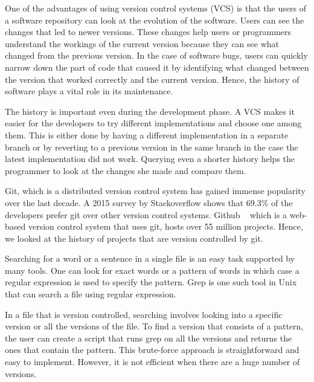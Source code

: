 


One of the advantages of using version control systems (VCS) is that the users of a software repository can look at the evolution of the software. Users can see the changes that led to newer versions. These changes help users or programmers understand the workings of the current version because they can see what changed from the previous version. In the case of software bugs, users can quickly narrow down the part of code that caused it by identifying what changed between the version that worked correctly and the current version. Hence, the history of software plays a vital role in its maintenance. 


The history is important even during the development phase. A VCS makes it easier for the developers to try different implementations and choose one among them. This is either done by having a different implementation in a separate branch or by reverting to a previous version in the same branch in the case the latest implementation did not work. Querying even a shorter history helps the programmer to look at the changes she made and compare them.

Git, which is a distributed version control system has gained immense popularity over the last decade. A 2015 survey by Stackoverflow shows that 69.3$\%$ of the developers prefer git over other version control systems. Github ~\cite{github} which is a web-based version control system that uses git, hosts over 55 million projects. Hence, we looked at the history of projects that are version controlled by git.


Searching for a word or a sentence in a single file is an easy task supported by many tools.%
One can look for exact words or a pattern of words in which case a regular expression is used to specify the pattern. 
Grep is one such tool in Unix that can search a file using regular expression. 


In a file that is version controlled, searching involves looking into a specific version or all the versions of the file. To find a version that consists of a pattern, the user can create a script that runs grep on all the versions and returns	 the ones that contain the pattern. This brute-force approach is straightforward and easy to implement. However, it is not efficient when there are a huge number of versions.


